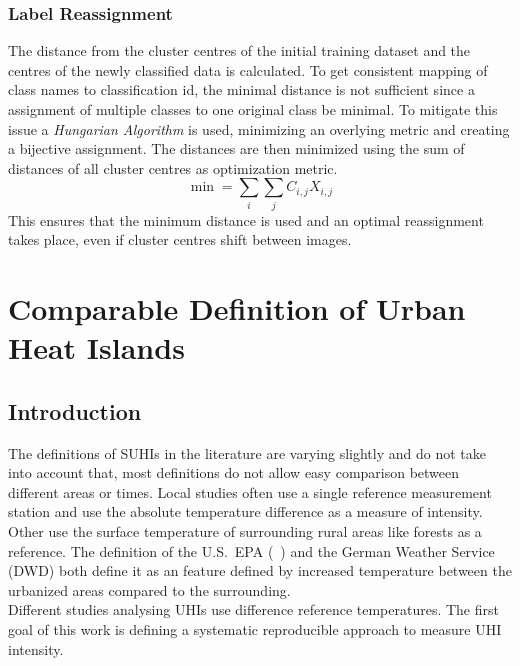 \documentclass[12pt,a4paper, english,twoside]{scrartcl}
\begin{document}
   \subsubsection{Label Reassignment}\label{sec:labelassignment}
    The distance from the cluster centres of the initial training dataset and the centres of the newly classified data is calculated. 
    To get consistent mapping of class names to classification id, the minimal distance is not sufficient since a assignment of multiple classes to one original class be minimal. 
    To mitigate this issue a \textit{Hungarian Algorithm} is used, minimizing an overlying metric and creating a bijective assignment. 
    The distances are then minimized using the sum of distances of all cluster centres as optimization metric.
      \begin{equation}
        \min = \sum_{i}\sum_{j} C_{i,j}X_{i,j}
      \end{equation}
    This ensures that the minimum distance is used and an optimal reassignment takes place, even if cluster centres shift between images.
\newpage
\section{Comparable Definition of Urban Heat Islands}\label{sec:definition}
    \subsection{Introduction}
      The definitions of \glspl{SUHI} in the literature are varying slightly and do not take into account that, most definitions do not allow easy comparison between different areas or times.
      Local studies often use a single reference measurement station and use the absolute temperature difference as a measure of intensity.
      Other use the surface temperature of surrounding rural areas like forests as a reference.
      The definition of the U.S.~EPA (~\cite{EPA2008}) and the German Weather Service (\gls{DWD}) both define it as an feature defined by increased temperature between the urbanized areas compared to the surrounding.\\ 
      Different studies analysing \glspl{UHI} use difference reference temperatures.
      The first goal of this work is defining a systematic reproducible approach to measure \gls{UHI} intensity.
\end{document}
